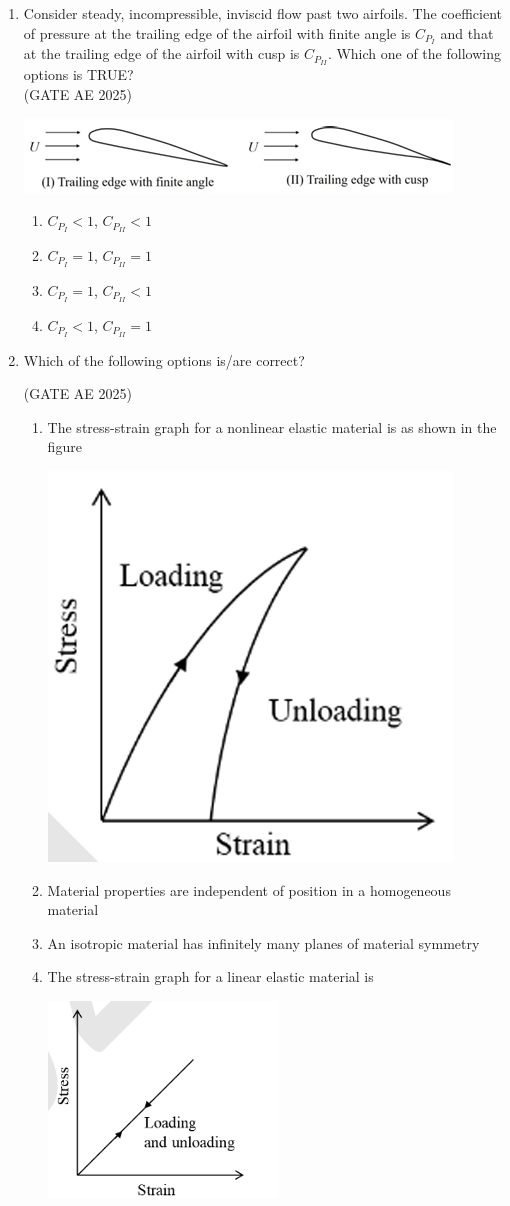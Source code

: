 \documentclass[journal,12pt,onecolumn]{IEEEtran}
\theoremstyle{remark}
\begin{document}
\begin{flushleft}
\begin{enumerate}
\item Consider steady, incompressible, inviscid flow past two airfoils. The coefficient of pressure at the trailing edge of the airfoil with finite angle is $C_{P_I}$ and that at the trailing edge of the airfoil with cusp is $C_{P_{II}}$. Which one of the following options is TRUE?\\ \hfill (GATE AE 2025)\\
\begin{center}
\includegraphics[width=0.5\columnwidth]{figs/angle.png}
\end{center}
\begin{enumerate}
    \item $C_{P_I} < 1$, $C_{P_{II}} < 1$
    \item $C_{P_I} = 1$, $C_{P_{II}} = 1$
    \item $C_{P_I} = 1$, $C_{P_{II}} < 1$
    \item $C_{P_I} < 1$, $C_{P_{II}} = 1$
\end{enumerate}

\item  Which of the following options is/are correct?

\hfill (GATE AE 2025)

\begin{enumerate}
    \item The stress-strain graph for a nonlinear elastic material is as shown in the figure 
    
    \hfill{\includegraphics[width=0.25\columnwidth]{figs/1.png}}
    
    \item Material properties are independent of position in a homogeneous material
    \item An isotropic material has infinitely many planes of material symmetry
    \item The stress-strain graph for a linear elastic material is
    
    \hfill{\includegraphics[width=0.25\columnwidth]{figs/2.png}}
    

\end{enumerate}
\end{enumerate}
\end{flushleft}
\end{document}
